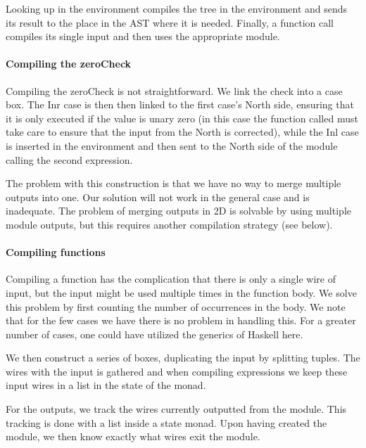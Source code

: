 Looking up in the environment compiles the tree in the environment and
sends its result to the place in the AST where it is needed. Finally,
a function call compiles its single input and then uses the
appropriate module.

\paragraph{Compiling the zeroCheck}
\label{sec:compiling-zerochk}

Compiling the zeroCheck is not straightforward. We link the check
into a case box. The Inr case is then then linked to the first case's
North side, ensuring that it is only executed if the value is unary
zero (in this case the function called must take care to ensure that
the input from the North is corrected), while the Inl case is inserted
in the environment and then sent to the North side of the module
calling the second expression.

The problem with this construction is that we have no way to merge
multiple outputs into one. Our solution will not work in the general
case and is inadequate. The problem of merging outputs in 2D is
solvable by using multiple module outputs, but this requires another
compilation strategy (see below).

\paragraph{Compiling functions}
\label{sec:compiling-functions}

Compiling a function has the complication that there is only a single
wire of input, but the input might be used multiple times in the
function body. We solve this problem by first counting the number of
occurrences in the body. We note that for the few cases we have there
is no problem in handling this. For a greater number of cases, one could
have utilized the generics of Haskell here.

We then construct a series of boxes, duplicating the input by
splitting tuples. The wires with the input is gathered and when
compiling expressions we keep these input wires in a list in the state
of the monad.

For the outputs, we track the wires currently outputted from the
module. This tracking is done with a list inside a state monad. Upon
having created the module, we then know exactly what wires exit the
module.

